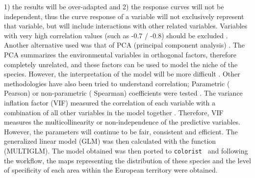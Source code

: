 \documentclass[12pt,a4paper]{article}
\begin{document}
1) the results will be over-adapted and 2) the response curves will not be independent, thus the curve response of a variable will not exclusively represent that variable, but will include interactions with other related variables.
Variables with very high correlation values (such as -0.7 / -0.8) should be excluded \citep{dor13}.
Another alternative used was that of PCA (principal component analysis) \citep{pere}.
The PCA summarizes the environmental variables in orthogonal factors, therefore completely unrelated, and these factors can be used to model the niche of the species. However, the interpretation of the model will be more difficult \citep{sil}. 
Other methodologies have also been tried to understand correlation; Parametric ( Pearson) or non-parametric ( Spearman) coefficients were tested \citep{fiel}.
The variance inflation factor (VIF) measured the correlation of each variable with a combination of all other variables in the model together \citep{dor13}. Therefore, VIF measures the multicollinearity or non-independence of the predictive variables. However, the parameters will continue to be fair, consistent and efficient.
The generalized linear model (GLM) was then calculated with the function (MULTIGLM).
The model obtained was then ported to \texttt{colorist } and following the workflow, the maps representing the distribution of these species and the level of specificity of each area within the European territory were obtained. 
\end{document}
